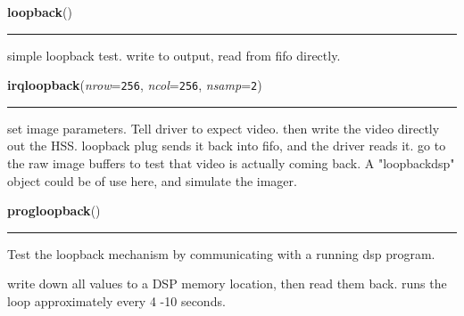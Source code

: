     \label{loopback:loopback}

    \vspace{0.5ex}

    \begin{boxedminipage}{\textwidth}

    \raggedright \textbf{loopback}()

    \vspace{-1.5ex}

    \rule{\textwidth}{0.5\fboxrule}
    simple loopback test. write to output, read from fifo directly.

    \vspace{1ex}

    \end{boxedminipage}

    \label{loopback:irqloopback}

    \vspace{0.5ex}

    \begin{boxedminipage}{\textwidth}

    \raggedright \textbf{irqloopback}(\textit{nrow}=\texttt{256}, \textit{ncol}=\texttt{256}, \textit{nsamp}=\texttt{2})

    \vspace{-1.5ex}

    \rule{\textwidth}{0.5\fboxrule}
    set image parameters. Tell driver to expect video. then write the video
    directly out the HSS. loopback plug sends it back into fifo, and the 
    driver reads it. go to the raw image buffers to test that video is 
    actually coming back. A "loopbackdsp" object could be of use here, and 
    simulate the imager.

    \vspace{1ex}

    \end{boxedminipage}

    \label{loopback:progloopback}

    \vspace{0.5ex}

    \begin{boxedminipage}{\textwidth}

    \raggedright \textbf{progloopback}()

    \vspace{-1.5ex}

    \rule{\textwidth}{0.5\fboxrule}
    Test the loopback mechanism by communicating with a running dsp 
    program.

    write down all values to a DSP memory location, then read them back. 
    runs the loop approximately every 4 -10 seconds.

    \vspace{1ex}

    \end{boxedminipage}

